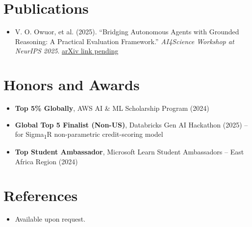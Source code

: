 \documentclass[11pt,a4paper,sans]{moderncv}
\begin{document}

\section{Publications}
\vspace{1pt}
\begin{itemize}

\item V. O. Owuor, et al. (2025). ``Bridging Autonomous Agents with Grounded Reasoning: A Practical Evaluation Framework.'' \textit{AI4Science Workshop at NeurIPS 2025}. \href{https://arxiv.org}{arXiv link pending}

\end{itemize}


\section{Honors and Awards}
\vspace{1pt}
\begin{itemize}

\item{\textbf{Top 5\% Globally}, AWS AI \& ML Scholarship Program (2024)}

\item{\textbf{Global Top 5 Finalist (Non-US)}, Databricks Gen AI Hackathon (2025) -- for Sigma\textsubscript{1}R non-parametric credit-scoring model}

\item{\textbf{Top Student Ambassador}, Microsoft Learn Student Ambassadors -- East Africa Region (2024)}

\end{itemize}


\section{References}
\vspace{1pt}
\begin{itemize}
 \item{Available upon request.}
\end{itemize}
\end{document}
